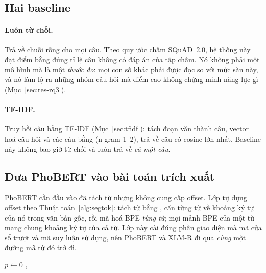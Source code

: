 \subsection{Hai baseline}
\label{sec:baselines}

\paragraph{Luôn từ chối.} Trả về chuỗi rỗng cho mọi câu. Theo quy ước chấm SQuAD~2.0, hệ thống
này đạt điểm bằng đúng tỉ lệ câu không có đáp án của tập chấm. Nó không phải một mô hình mà là
một \emph{thước đo}: mọi con số khác phải được đọc so với mức sàn này, và nó làm lộ ra những
nhóm câu hỏi mà điểm cao không chứng minh năng lực gì (Mục~\ref{sec:res-rq3}).

\paragraph{TF-IDF.} Truy hồi câu bằng TF-IDF (Mục~\ref{sec:tfidf}): tách đoạn văn thành câu,
vector hoá câu hỏi và các câu bằng  (n-gram 1--2), trả về câu có cosine
lớn nhất. Baseline này không bao giờ từ chối và luôn trả về \emph{cả một câu}.

\subsection{Đưa PhoBERT vào bài toán trích xuất}
\label{sec:segtok}

PhoBERT cần đầu vào đã tách từ nhưng không cung cấp offset. Lớp  tự
dựng offset theo Thuật toán~\ref{alg:segtok}: tách từ bằng , căn từng từ về khoảng
ký tự của nó trong văn bản gốc, rồi mã hoá BPE \emph{từng từ}; mọi mảnh BPE của một từ mang
chung khoảng ký tự của cả từ. Lớp này cài đúng phần giao diện mà mã cửa sổ trượt và mã suy luận
sử dụng, nên PhoBERT và XLM-R đi qua \emph{cùng} một đường mã từ đó trở đi.

\begin{algorithm}[htbp]
\caption{Dựng offset cho PhoBERT từ bước tách từ}
\label{alg:segtok}
$p \leftarrow 0$\;
\Return {}, \;
\end{algorithm}

